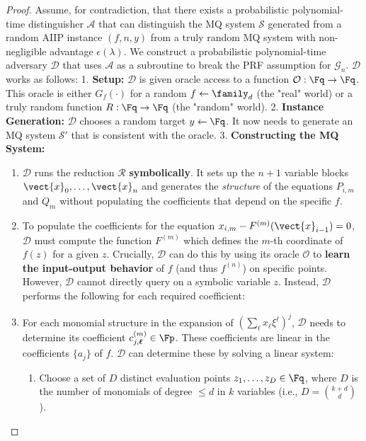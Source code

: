            \begin{proof}
                Assume, for contradiction, that there exists a probabilistic polynomial-time distinguisher $\mathcal{A}$ that can distinguish the MQ system $\mathcal{S}$ generated from a random AIIP instance $(f, n, y)$ from a truly random MQ system with non-negligible advantage $\epsilon(\lambda)$.
                We construct a probabilistic polynomial-time adversary $\mathcal{D}$ that uses $\mathcal{A}$ as a subroutine to break the PRF assumption for $\mathcal{G}_n$. $\mathcal{D}$ works as follows:
                1.  \textbf{Setup:} $\mathcal{D}$ is given oracle access to a function $\mathcal{O}: \Fq \to \Fq$. This oracle is either $G_f(\cdot)$ for a random $f \leftarrow \family_d$ (the "real" world) or a truly random function $R: \Fq \to \Fq$ (the "random" world).
                2.  \textbf{Instance Generation:} $\mathcal{D}$ chooses a random target $y \leftarrow \Fq$. It now needs to generate an MQ system $\mathcal{S}'$ that is consistent with the oracle.
                3.  \textbf{Constructing the MQ System:}
                    \begin{enumerate}
                        \item $\mathcal{D}$ runs the reduction $\mathcal{R}$ \textbf{symbolically}. It sets up the $n+1$ variable blocks $\vect{x}_0, \ldots, \vect{x}_n$ and generates the \textit{structure} of the equations $P_{i,m}$ and $Q_m$ without populating the coefficients that depend on the specific $f$.
                        \item To populate the coefficients for the equation $x_{i,m} - F^{(m)}(\vect{x}_{i-1}) = 0$, $\mathcal{D}$ must compute the function $F^{(m)}$ which defines the $m$-th coordinate of $f(z)$ for a given $z$. Crucially, $\mathcal{D}$ can do this by using its oracle $\mathcal{O}$ to \textbf{learn the input-output behavior} of $f$ (and thus $f^{(n)}$) on specific points. However, $\mathcal{D}$ cannot directly query on a symbolic variable $z$. Instead, $\mathcal{D}$ performs the following for each required coefficient:
                        \item For each monomial structure in the expansion of $(\sum_{\ell} x_\ell \xi^\ell)^j$, $\mathcal{D}$ needs to determine its coefficient $c_{j, \boldsymbol{\ell}}^{(m)} \in \Fp$. These coefficients are linear in the coefficients $\{a_j\}$ of $f$. $\mathcal{D}$ can determine these by solving a linear system:
                        \begin{enumerate}
                            \item Choose a set of $D$ distinct evaluation points $z_1, \ldots, z_D \in \Fq$, where $D$ is the number of monomials of degree $\leq d$ in $k$ variables (i.e., $D = \binom{k+d}{d}$).

\end{enumerate}
\end{enumerate}
\end{proof}
